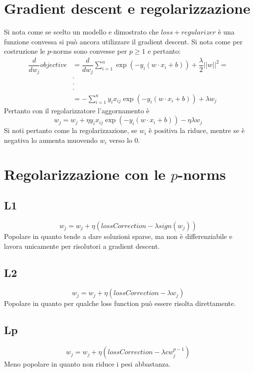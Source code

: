 \section{Gradient descent e regolarizzazione}
Si nota come se scelto un modello e dimostrato che $loss+regularizer$ \`e una funzione convessa si pu\`o ancora utilizzare il gradient descent.
Si nota come per costruzione le $p$-norms sono convesse per $p\ge 1$ e pertanto:
\begin{align*}
	\dfrac{d}{dw_j}objective&=\dfrac{d}{dw_j}\sum\limits_{i=1}^n\exp(-y_i(w\cdot x_i + b))+\dfrac{\lambda}{2}||w||^2=\\
				&\cdot\\
				&\cdot\\
				&\cdot\\
				&=-\sum\limits_{i=1}^ny_ix_{ij}\exp(-y_i(w\cdot x_i+b))+\lambda w_j
\end{align*}
Pertanto con il regolarizzatore l'aggornamento \`e
$$w_j=w_j+\eta y_ix_{ij}\exp(-y_i(w\cdot x_i+b))-\eta\lambda w_j$$
Si noti pertanto come la regolarizzazione, se $w_i$ \`e positiva la riduce, mentre se \`e negativa lo aumenta muovendo $w_i$ verso lo $0$.

\section{Regolarizzazione con le $p$-norms}

	\subsection{L1}
	$$w_j = w_j + \eta(lossCorrection - \lambda sign(w_j))$$
	Popolare in quanto tende a dare soluzioni sparse, ma non \`e differenziabile e lavora unicamente per risolutori a gradient descent.
		
	\subsection{L2}
	$$w_j = w_j + \eta(lossCorrection - \lambda w_j)$$
	Popolare in quanto per qualche loss function pu\`o essere risolta direttamente.

	\subsection{Lp}
	$$w_j = w_j + \eta(lossCorrection - \lambda cw_j^{p-1})$$
	Meno popolare in quanto non riduce i pesi abbastanza.

